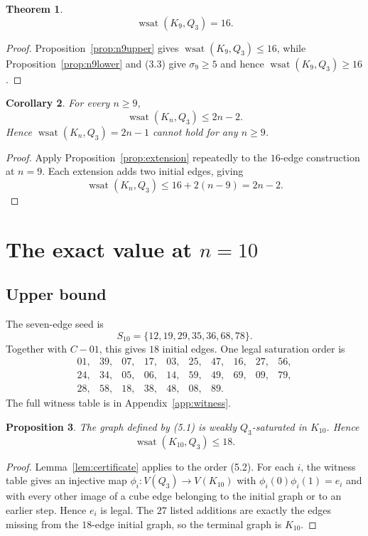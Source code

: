 \documentclass[11pt]{article}
\numberwithin{equation}{section}
\newtheorem{theorem}{Theorem}[section]
\newtheorem{proposition}[theorem]{Proposition}
\newtheorem{corollary}[theorem]{Corollary}
\newcommand{\wsat}{\operatorname{wsat}}
\begin{document}
\begin{theorem}\label{thm:n9}
\[
\boxed{\wsat(K_9,Q_3)=16.}
\]
\end{theorem}

\begin{proof}
Proposition~\ref{prop:n9upper} gives $\wsat(K_9,Q_3)\le16$, while Proposition~\ref{prop:n9lower} and (3.3) give $\sigma_9\ge5$ and hence $\wsat(K_9,Q_3)\ge16$.
\end{proof}

\begin{corollary}\label{cor:n9family}
For every $n\ge9$,
\[
\wsat(K_n,Q_3)\le2n-2.
\]
Hence $\wsat(K_n,Q_3)=2n-1$ cannot hold for any $n\ge9$.
\end{corollary}

\begin{proof}
Apply Proposition~\ref{prop:extension} repeatedly to the $16$-edge
construction at $n=9$. Each extension adds two initial edges, giving
\[
\wsat(K_n,Q_3)\le16+2(n-9)=2n-2.
\]
\end{proof}

\section{\texorpdfstring{The exact value at $n=10$}{The exact value at n=10}}\label{sec:n10}

\subsection{Upper bound}
The seven-edge seed is
\[
S_{10}=\{12,19,29,35,36,68,78\}.
\tag{5.1}
\]
Together with $C-01$, this gives $18$ initial edges. One legal saturation order is
\[
\begin{array}{cccccccccc}
01,&39,&07,&17,&03,&25,&47,&16,&27,&56,\\
24,&34,&05,&06,&14,&59,&49,&69,&09,&79,\\
28,&58,&18,&38,&48,&08,&89.
\end{array}
\tag{5.2}
\]
The full witness table is in Appendix~\ref{app:witness}.

\begin{proposition}\label{prop:n10upper}
The graph defined by (5.1) is weakly $Q_3$-saturated in $K_{10}$. Hence
\[
\wsat(K_{10},Q_3)\le18.
\]
\end{proposition}

\begin{proof}
Lemma~\ref{lem:certificate} applies to the order (5.2). For each $i$, the witness table gives an injective map $\phi_i:V(Q_3)\to V(K_{10})$ with $\phi_i(0)\phi_i(1)=e_i$ and with every other image of a cube edge belonging to the initial graph or to an earlier step. Hence $e_i$ is legal. The $27$ listed additions are exactly the edges missing from the $18$-edge initial graph, so the terminal graph is $K_{10}$.
\end{proof}
\end{document}
